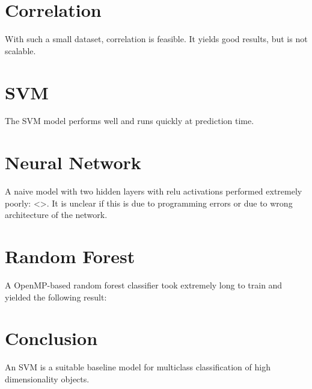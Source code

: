 \documentclass{article}
\begin{document}
\section{Correlation}
With such a small dataset, correlation is feasible.
It yields good results, but is not scalable.


\section{SVM}
The SVM model performs well and runs quickly at prediction time.

\section{Neural Network}
A naive model with two hidden layers with relu activations performed extremely poorly: <>.
It is unclear if this is due to programming errors or due to wrong architecture of the network.


\section{Random Forest}
A OpenMP-based random forest classifier took extremely long to train and yielded the following result:


\section{Conclusion}
An SVM is a suitable baseline model for multiclass classification of high dimensionality objects.
\end{document}
